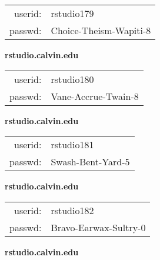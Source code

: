 \documentclass{article}\usepackage[]{graphicx}\usepackage[]{color}
\begin{document}
\begin{multicols}{3}
\begin{minipage}{.3\textwidth}
\begin{tabular}{rl}
userid: & rstudio179\\
passwd: & Choice-Theism-Wapiti-8

\vspace{5mm}

\end{tabular}\end{minipage}

\vspace{5mm}

\begin{minipage}{.3\textwidth}
\centerline{\textbf{rstudio.calvin.edu}}
\medskip
\begin{tabular}{rl}

userid: & rstudio180\\
passwd: & Vane-Accrue-Twain-8

\vspace{5mm}

\end{tabular}\end{minipage}

\vspace{5mm}

\begin{minipage}{.3\textwidth}
\centerline{\textbf{rstudio.calvin.edu}}
\medskip
\begin{tabular}{rl}

userid: & rstudio181\\
passwd: & Swash-Bent-Yard-5

\vspace{5mm}

\end{tabular}\end{minipage}

\vspace{5mm}

\begin{minipage}{.3\textwidth}
\centerline{\textbf{rstudio.calvin.edu}}
\medskip
\begin{tabular}{rl}

userid: & rstudio182\\
passwd: & Bravo-Earwax-Sultry-0

\vspace{5mm}

\end{tabular}\end{minipage}

\vspace{5mm}

\begin{minipage}{.3\textwidth}
\centerline{\textbf{rstudio.calvin.edu}}
\medskip
\begin{tabular}{rl}


\end{tabular}
\end{minipage}
\end{multicols}
\end{document}
